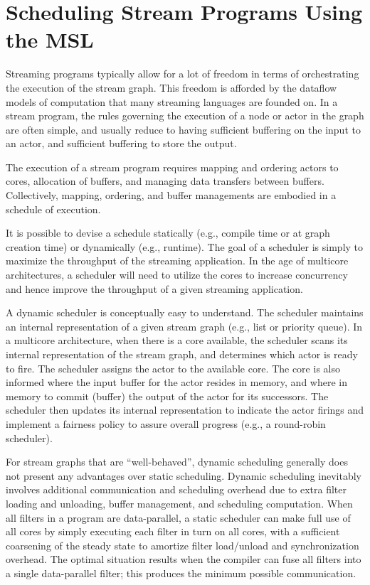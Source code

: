 \section{Scheduling Stream Programs Using the MSL}\label{ch:ds}

Streaming programs typically allow for a lot of freedom in terms of
orchestrating the execution of the stream graph. This freedom is
afforded by the dataflow models of computation that many streaming
languages are founded on. In a stream program, the rules governing the
execution of a node or actor in the graph are often simple, and usually
reduce to having sufficient buffering on the input to an actor, and
sufficient buffering to store the output.

The execution of a stream program requires mapping and ordering actors
to cores, allocation of buffers, and managing data transfers between
buffers. Collectively, mapping, ordering, and buffer managements are
embodied in a schedule of execution.

It is possible to devise a schedule statically (e.g., compile time or
at graph creation time) or dynamically (e.g., runtime). The goal of a
scheduler is simply to maximize the throughput of the streaming
application. In the age of multicore architectures, a scheduler will
need to utilize the cores to increase concurrency and hence improve
the throughput of a given streaming application. 

A dynamic scheduler is conceptually easy to understand. The scheduler
maintains an internal representation of a given stream graph (e.g.,
list or priority queue). In a multicore architecture, when there is a
core available, the scheduler scans its internal representation of the
stream graph, and determines which actor is ready to fire.
The scheduler assigns the actor to the available core. The core is
also informed where the input buffer for the actor resides in memory,
and where in memory to commit (buffer) the output of the actor for its
successors. The scheduler then updates its internal representation to
indicate the actor firings and implement a fairness policy to assure
overall progress (e.g., a round-robin scheduler).

For stream graphs that are ``well-behaved'', dynamic scheduling
generally does not present any advantages over static
scheduling. Dynamic scheduling inevitably involves additional
communication and scheduling overhead due to extra filter loading and
unloading, buffer management, and scheduling computation. When all
filters in a program are data-parallel, a static scheduler can make
full use of all cores by simply executing each filter in turn on all
cores, with a sufficient coarsening of the steady state to amortize
filter load/unload and synchronization overhead. The optimal
situation results when the compiler can fuse all filters into a single
data-parallel filter; this produces the minimum possible communication.

